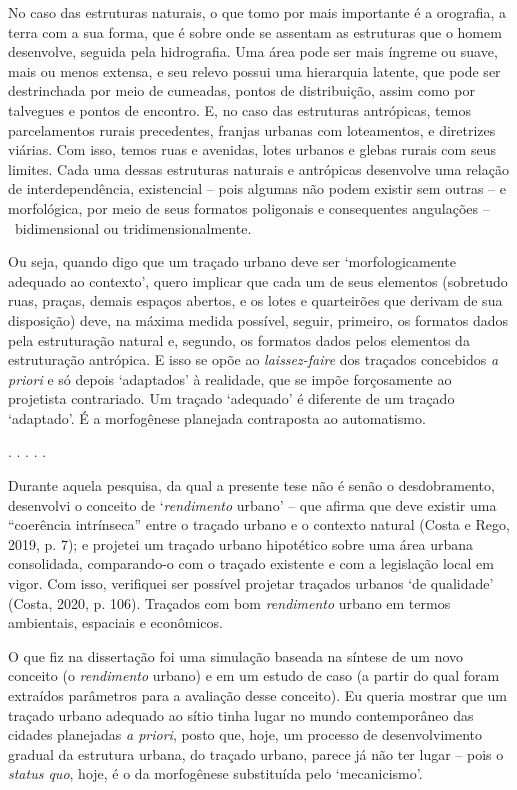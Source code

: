 \documentclass[12pt, a4paper]{book} %
\begin{document}
        No caso das estruturas naturais, o que tomo por mais importante é a orografia, a terra com a sua forma, que é sobre onde se assentam as estruturas que o homem desenvolve, seguida pela hidrografia. Uma área pode ser mais íngreme ou suave, mais ou menos extensa, e seu relevo possui uma hierarquia latente, que pode ser destrinchada por meio de cumeadas, pontos de distribuição, assim como por talvegues e pontos de encontro. E, no caso das estruturas antrópicas, temos parcelamentos rurais precedentes, franjas urbanas com loteamentos, e diretrizes viárias. Com isso, temos ruas e avenidas, lotes urbanos e glebas rurais com seus limites. Cada uma dessas estruturas naturais e antrópicas desenvolve uma relação de interdependência, existencial – pois algumas não podem existir sem outras – e morfológica, por meio de seus formatos poligonais e consequentes angulações – bidimensional ou tridimensionalmente. 

        Ou seja, quando digo que um traçado urbano deve ser `morfologicamente adequado ao contexto', quero implicar que cada um de seus elementos (sobretudo ruas, praças, demais espaços abertos, e os lotes e quarteirões que derivam de sua disposição) deve, na máxima medida possível, seguir, primeiro, os formatos dados pela estruturação natural e, segundo, os formatos dados pelos elementos da estruturação antrópica. E isso se opõe ao \textit{laissez-faire} dos traçados concebidos \textit{a priori} e só depois `adaptados' à realidade, que se impõe forçosamente ao projetista contrariado. Um traçado `adequado' é diferente de um traçado `adaptado'. É a morfogênese planejada contraposta ao automatismo.

        \begin{center}
        . . . . .
        \end{center}

        Durante aquela pesquisa, da qual a presente tese não é senão o desdobramento, desenvolvi o conceito de `\textit{rendimento} urbano' – que afirma que deve existir uma ``coerência intrínseca'' entre o traçado urbano e o contexto natural (Costa e Rego, 2019, p. 7); e projetei um traçado urbano hipotético sobre uma área urbana consolidada, comparando-o com o traçado existente e com a legislação local em vigor. Com isso, verifiquei ser possível projetar traçados urbanos `de qualidade' (Costa, 2020, p. 106). Traçados com bom \textit{rendimento} urbano em termos ambientais, espaciais e econômicos.

        O que fiz na dissertação foi uma simulação baseada na síntese de um novo conceito (o \textit{rendimento} urbano) e em um estudo de caso (a partir do qual foram extraídos parâmetros para a avaliação desse conceito). Eu queria mostrar que um traçado urbano adequado ao sítio tinha lugar no mundo contemporâneo das cidades planejadas \textit{a priori}, posto que, hoje, um processo de desenvolvimento gradual da estrutura urbana, do traçado urbano, parece já não ter lugar – pois o \textit{status quo}, hoje, é o da morfogênese substituída pelo `mecanicismo'. 
\end{document}
